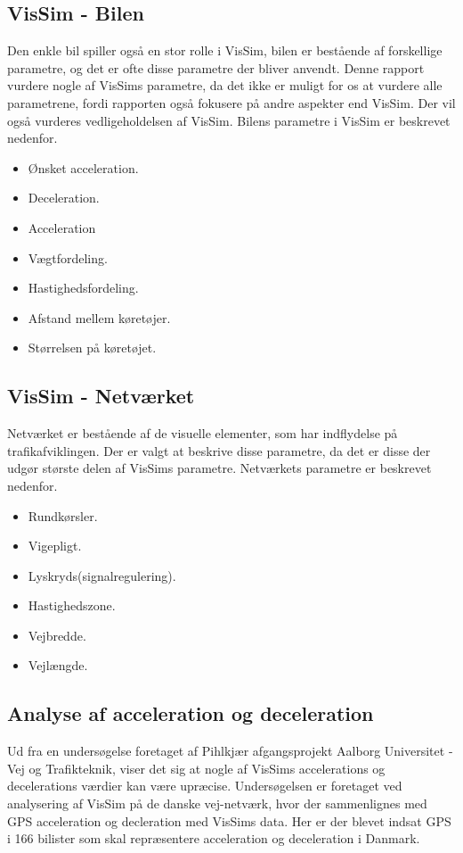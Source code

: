 \subsection{VisSim - Bilen}
Den enkle bil spiller også en stor rolle i VisSim, bilen er bestående af forskellige parametre, og det er ofte disse parametre der bliver anvendt. Denne rapport vurdere nogle af VisSims parametre, da det ikke er muligt for os at vurdere alle parametrene, fordi rapporten også fokusere på andre aspekter end VisSim. Der vil også vurderes vedligeholdelsen af VisSim. Bilens parametre i VisSim er beskrevet nedenfor.

\begin{itemize}
\item Ønsket acceleration.
\item Deceleration.
\item Acceleration
\item Vægtfordeling.
\item Hastighedsfordeling.
\item Afstand mellem køretøjer.
\item Størrelsen på køretøjet.
\end{itemize}

\subsection{VisSim - Netværket}
Netværket er bestående af de visuelle elementer, som har indflydelse på trafikafviklingen. Der er valgt at beskrive disse parametre, da det er disse der udgør største delen af VisSims parametre.
Netværkets parametre er beskrevet nedenfor.

\begin{itemize}
\item Rundkørsler.
\item Vigepligt.
\item Lyskryds(signalregulering).
\item Hastighedszone.
\item Vejbredde.
\item Vejlængde.
\end{itemize}

\subsection{Analyse af acceleration og deceleration}
Ud fra en undersøgelse foretaget af Pihlkjær afgangsprojekt Aalborg Universitet - Vej og Trafikteknik, viser det sig at nogle af VisSims accelerations og decelerations værdier kan være upræcise. Undersøgelsen er foretaget ved analysering af VisSim på de danske vej-netværk, hvor der sammenlignes med GPS acceleration og decleration med VisSims data. Her er der blevet indsat GPS i 166 bilister som skal repræsentere acceleration og deceleration i Danmark.

